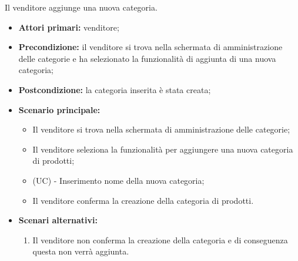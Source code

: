 Il venditore aggiunge una nuova categoria.
\begin{itemize}
    \item \textbf{Attori primari:} venditore;
    \item \textbf{Precondizione:} il venditore si trova nella schermata di amministrazione delle categorie e ha selezionato la funzionalità di aggiunta di una nuova categoria;
    \item \textbf{Postcondizione:} la categoria inserita è stata creata;
    \item \textbf{Scenario principale:}
    \begin{itemize}
    	\item Il venditore si trova nella schermata di amministrazione delle categorie;
    	\item Il venditore seleziona la funzionalità per aggiungere una nuova categoria di prodotti;
    	\item (UC) - Inserimento nome della nuova categoria;
    	\item Il venditore conferma la creazione della categoria di prodotti.
    \end{itemize} 
    \item \textbf{Scenari alternativi:}
    \begin{enumerate}[label=\lett]
    	\item Il venditore non conferma la creazione della categoria e di conseguenza questa non verrà aggiunta.
    \end{enumerate} 
\end{itemize}

\resetSubUC

